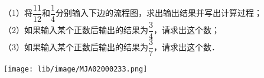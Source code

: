 （1）将$\dfrac{11}{12}$和$\dfrac{1}{4}$分别输入下边的流程图，求出输出结果并写出计算过程；\\
（2）如果输入某个正数后输出的结果为$\dfrac{3}{4}$，请求出这个数；\\
（3）如果输入某个正数后输出的结果为$\dfrac{3}{7}$，请求出这个数．
\begin{flushright}
\texttt{[image: lib/image/MJA02000233.png]}
\end{flushright}